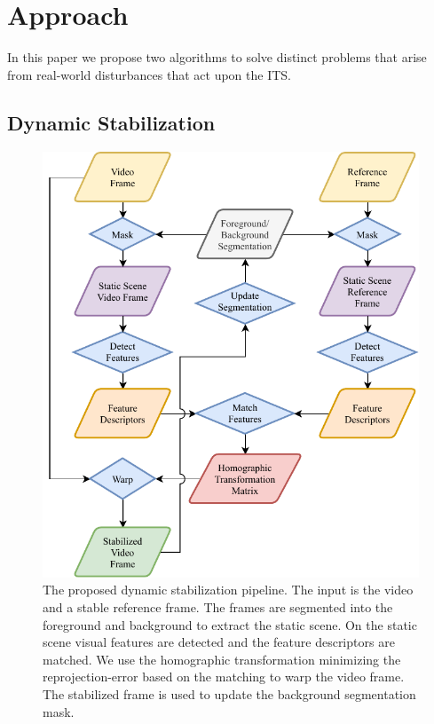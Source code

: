 
\section{Approach}
In this paper we propose two algorithms to solve distinct problems that arise from real-world disturbances that act upon the ITS.

\subsection{Dynamic Stabilization}
\label{sec:dynamic_stabilization_approach}

\begin{figure}[t]
   \begin{center}
      \includegraphics[width=0.8\linewidth]{diagrams/DynamicStabilization.pdf}
   \end{center}
   \caption{
      The proposed dynamic stabilization pipeline. 
      The input is the video and a stable reference frame.
      The frames are segmented into the foreground and background to extract the static scene.
      On the static scene visual features are detected and the feature descriptors are matched.
      We use the homographic transformation minimizing the reprojection-error based on the matching to warp the video frame.
      The stabilized frame is used to update the background segmentation mask.
       }
   \label{fig:dynamic_stabilization_algorithm}
\end{figure}


